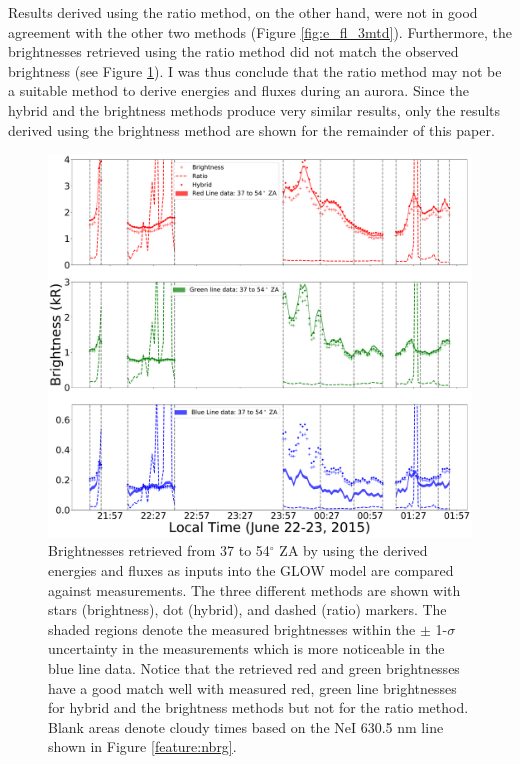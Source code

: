 \documentclass[crop=false,class=mitthesis,oneside,font=12pt]{standalone}
\begin{document}
Results derived using the ratio method, on the other hand, were not in good agreement with the other two methods (Figure \ref{fig:e_fl_3mtd}). Furthermore, the brightnesses retrieved using the ratio method did not match the observed brightness (see Figure \ref{fig:e_fl_b_comp}). I was thus conclude that the ratio method may not be a suitable method to derive energies and fluxes during an aurora. Since the hybrid and the brightness methods produce very similar results, only the results derived using the brightness method are shown for the remainder of this paper.
\begin{figure}[H]
	\centering\includegraphics[width=35pc]{different_method_retriv_comp.pdf}
	\caption{Brightnesses retrieved from 37 to 54$^\circ$ ZA by using the derived energies and fluxes as inputs into the GLOW model are compared against measurements. The three different methods are shown with stars (brightness), dot (hybrid), and dashed (ratio) markers. The shaded regions denote the measured brightnesses within the $\pm$ 1-$\sigma$ uncertainty in the measurements which is more noticeable in the blue line data. Notice that the retrieved red and green brightnesses have a good match well with measured red, green line brightnesses for hybrid and the brightness methods but not for the ratio method. Blank areas denote cloudy times based on the NeI 630.5 nm line shown in Figure \ref{feature:nbrg}.}
	\label{fig:e_fl_b_comp}
\end{figure}
\end{document}
